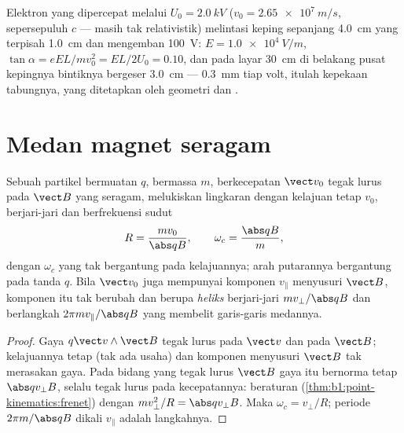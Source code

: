 \begin{example}\label{ex:b1:charged-particles:crt}
Elektron yang dipercepat melalui $U_0 = \qty{2.0}{kV}$ ($v_0 = \qty{2.65e7}{m/s}$,
sepersepuluh $c$ --- masih tak relativistik) melintasi keping sepanjang \qty{4.0}{cm}
yang terpisah \qty{1.0}{cm} dan mengemban \qty{100}{V}: $E = \qty{1.0e4}{V/m}$,
$\tan\alpha = eEL/mv_0^2 = EL/2U_0 = 0.10$, dan pada layar \qty{30}{cm}
di belakang pusat kepingnya bintiknya bergeser \qty{3.0}{cm} --- \qty{0.3}{mm}
tiap volt, itulah kepekaan tabungnya, yang ditetapkan  oleh
geometri dan .
\end{example}

\section{Medan magnet seragam}

\begin{theorem}\label{thm:b1:charged-particles:bfield}
Sebuah partikel bermuatan $q$, bermassa $m$, berkecepatan $\vect v_0$ tegak lurus pada
$\vect B$ yang seragam, melukiskan lingkaran dengan kelajuan tetap $v_0$, berjari-jari
dan berfrekuensi sudut
\[
R = \frac{mv_0}{\abs q B}, \qquad \omega_c = \frac{\abs q B}{m},
\]
dengan \emph{} $\omega_c$ yang tak bergantung pada kelajuannya;
arah putarannya bergantung pada tanda $q$. Bila $\vect v_0$ juga mempunyai
komponen $v_\parallel$ menyusuri $\vect B$, komponen itu tak berubah dan
 berupa \emph{heliks} berjari-jari $mv_\perp/\abs qB$ dan berlangkah
$2\pi mv_\parallel/\abs qB$ yang membelit garis-garis medannya.
\end{theorem}

\begin{proof}
Gaya $q\vect v\wedge\vect B$ tegak lurus pada $\vect v$ dan pada $\vect B$;
kelajuannya tetap (tak ada usaha) dan komponen menyusuri $\vect B$ tak
merasakan gaya. Pada bidang yang tegak lurus $\vect B$ gaya itu bernorma
tetap $\abs qv_\perp B$, selalu tegak lurus pada kecepatannya:  beraturan (\cref{thm:b1:point-kinematics:frenet}) dengan $mv_\perp^2/R =
\abs qv_\perp B$. Maka $\omega_c = v_\perp/R$; periode $2\pi m/\abs qB$ dikali
$v_\parallel$ adalah langkahnya.
\end{proof}

